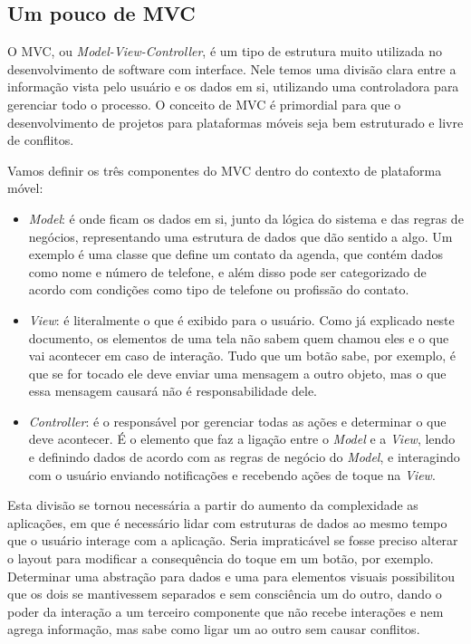 \documentclass[a4paper,12pt,brazil,doubleside]{book}
\begin{document}
\begin{singlespace}
\chapter{Um pouco de MVC}


O MVC, ou \emph{Model-View-Controller}, é um tipo de estrutura muito utilizada no desenvolvimento de software com interface. Nele temos uma divisão clara entre a informação vista pelo usuário e os dados em si, utilizando uma controladora para gerenciar todo o processo. O conceito de MVC é primordial para que o desenvolvimento de projetos para plataformas móveis seja bem estruturado e livre de conflitos.

Vamos definir os três componentes do MVC dentro do contexto de plataforma móvel:
\begin{itemize}
\item \emph{Model}: é onde ficam os dados em si, junto da lógica do sistema e das regras de negócios, representando uma estrutura de dados que dão sentido a algo. Um exemplo é uma classe que define um contato da agenda, que contém dados como nome e número de telefone, e além disso pode ser categorizado de acordo com condições como tipo de telefone ou profissão do contato.
\item \emph{View}: é literalmente o que é exibido para o usuário. Como já explicado neste documento, os elementos de uma tela não sabem quem chamou eles e o que vai acontecer em caso de interação. Tudo que um botão sabe, por exemplo, é que se for tocado ele deve enviar uma mensagem a outro objeto, mas o que essa mensagem causará não é responsabilidade dele.
\item \emph{Controller}: é o responsável por gerenciar todas as ações e determinar o que deve acontecer. É o elemento que faz a ligação entre o \emph{Model} e a \emph{View}, lendo e definindo dados de acordo com as regras de negócio do \emph{Model}, e interagindo com o usuário enviando notificações e recebendo ações de toque na \emph{View}.
\end{itemize}

Esta divisão se tornou necessária a partir do aumento da complexidade as aplicações, em que é necessário lidar com estruturas de dados ao mesmo tempo que o usuário interage com a aplicação. Seria impraticável se fosse preciso alterar o layout para modificar a consequência do toque em um botão, por exemplo. Determinar uma abstração para dados e uma para elementos visuais possibilitou que os dois se mantivessem separados e sem consciência um do outro, dando o poder da interação a um terceiro componente que não recebe interações e nem agrega informação, mas sabe como ligar um ao outro sem causar conflitos.

\end{singlespace}




\singlespace
{}
\cleardoublepage
\thispagestyle{empty}
{}


\doublespace
\end{document}
